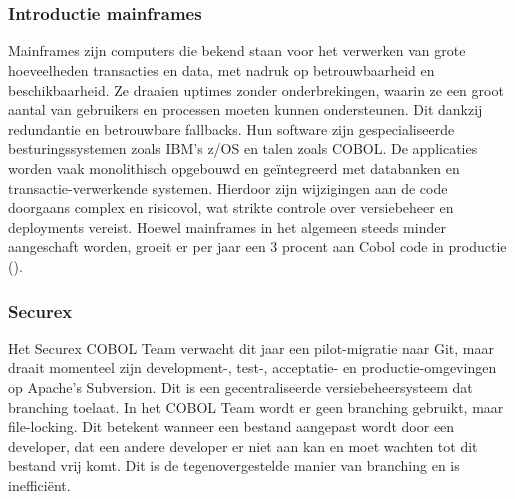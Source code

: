 \chapter{}%
\label{ch:stand-van-zaken}


\subsection{Introductie mainframes}
Mainframes zijn computers die bekend staan voor het verwerken van grote hoeveelheden transacties en data, met nadruk op betrouwbaarheid en beschikbaarheid. Ze draaien uptimes zonder onderbrekingen, waarin ze een groot aantal van gebruikers en processen moeten kunnen ondersteunen. Dit dankzij redundantie en betrouwbare fallbacks. Hun software zijn gespecialiseerde besturingssystemen zoals IBM's z/OS en talen zoals COBOL. De applicaties worden vaak monolithisch opgebouwd en geïntegreerd met databanken en transactie-verwerkende systemen. Hierdoor zijn wijzigingen aan de code doorgaans complex en risicovol, wat strikte controle over versiebeheer en deployments vereist.
Hoewel mainframes in het algemeen steeds minder aangeschaft worden, groeit er per jaar een 3 procent aan Cobol code in productie (\cite{Barnett2005}).

\subsection{Securex}

Het Securex COBOL Team verwacht dit jaar een pilot-migratie naar Git, maar draait momenteel zijn development-, test-, acceptatie- en productie-omgevingen op Apache's Subversion. Dit is een gecentraliseerde versiebeheersysteem dat branching toelaat. In het COBOL Team wordt er geen branching gebruikt, maar file-locking. Dit betekent wanneer een bestand aangepast wordt door een developer, dat een andere developer er niet aan kan en moet wachten tot dit bestand vrij komt. Dit is de tegenovergestelde manier van branching en is inefficiënt.


